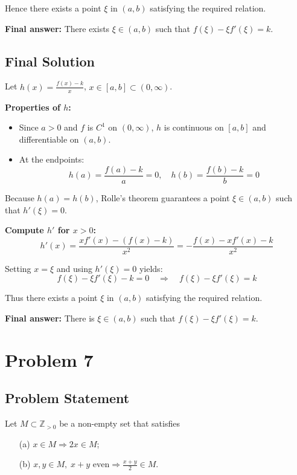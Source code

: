 \documentclass[12pt,a4paper]{article}
\theoremstyle{definition}
\begin{document}
Hence there exists a point $\xi$ in $(a,b)$ satisfying the required relation.

\textbf{Final answer:} There exists $\xi \in (a,b)$ such that $f(\xi) - \xi f'(\xi) = k$.

\subsection{Final Solution}
Let $h(x) = \frac{f(x) - k}{x}$, $x \in [a,b] \subset (0,\infty)$.

\textbf{Properties of $h$:}
\begin{itemize}
\item Since $a > 0$ and $f$ is $C^1$ on $(0,\infty)$, $h$ is continuous on $[a,b]$ and differentiable on $(a,b)$.
\item At the endpoints:
$$h(a) = \frac{f(a) - k}{a} = 0, \quad h(b) = \frac{f(b) - k}{b} = 0$$
\end{itemize}

Because $h(a) = h(b)$, Rolle's theorem guarantees a point $\xi \in (a,b)$ such that $h'(\xi) = 0$.

\textbf{Compute $h'$ for $x > 0$:}
$$h'(x) = \frac{xf'(x) - (f(x) - k)}{x^2} = -\frac{f(x) - xf'(x) - k}{x^2}$$

Setting $x = \xi$ and using $h'(\xi) = 0$ yields:
$$f(\xi) - \xi f'(\xi) - k = 0 \quad \Rightarrow \quad f(\xi) - \xi f'(\xi) = k$$

Thus there exists a point $\xi$ in $(a,b)$ satisfying the required relation.

\textbf{Final answer:} There is $\xi \in (a,b)$ such that $f(\xi) - \xi f'(\xi) = k$.

\section{Problem 7}

\subsection*{Problem Statement}
Let $M \subset \mathbb{Z}_{>0}$ be a non-empty set that satisfies

\begin{enumerate}
\item[(a)] $x \in M \Longrightarrow 2x \in M$;
\item[(b)] $x,y \in M,\; x+y \text{ even} \Longrightarrow \frac{x+y}{2} \in M$.
\end{enumerate}
\end{document}
